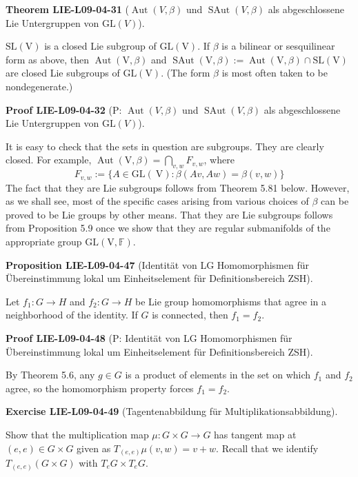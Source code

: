 \documentclass[10pt, letterpaper]{article}
\newcommand{\GL}{\mathrm{GL}}
\newcommand{\CustomHeading}[3]{%
  \par\medskip\noindent%
  \textbf{#1 #2} \textnormal{(#3)}.\enskip%
}
\newenvironment{PROP}[2]{\CustomHeading{Proposition}{#1}{#2}}{}
\newenvironment{THEO}[2]{\CustomHeading{Theorem}{#1}{#2}}{}
\newenvironment{EXE}[2]{\CustomHeading{Exercise}{#1}{#2}}{}
\newenvironment{PROOF}[2]{\CustomHeading{Proof}{#1}{#2}}{}
\begin{document}
\begin{THEO}{LIE-L09-04-31}{$\operatorname{Aut}(V,\beta)$ und $\operatorname{SAut}(V,\beta)$ als abgeschlossene Lie Untergruppen von $\GL(V)$}
$\mathrm{SL}(\mathrm{V})$ is a closed Lie subgroup of $\mathrm{GL}(\mathrm{V})$. If $\beta$ is a bilinear or sesquilinear form as above, then $\operatorname{Aut}(\mathrm{V}, \beta)$ and $\operatorname{SAut}(\mathrm{V}, \beta):= \operatorname{Aut}(\mathrm{V}, \beta) \cap \mathrm{SL}(\mathrm{V})$ are closed Lie subgroups of $\mathrm{GL}(\mathrm{V})$. (The form $\beta$ is most often taken to be nondegenerate.)
\end{THEO}

\begin{PROOF}{LIE-L09-04-32}{P: $\operatorname{Aut}(V,\beta)$ und $\operatorname{SAut}(V,\beta)$ als abgeschlossene Lie Untergruppen von $\GL(V)$}
It is easy to check that the sets in question are subgroups. They are clearly closed. For example, $\operatorname{Aut}(\mathrm{V}, \beta)=\bigcap_{v, w} F_{v, w}$, where
$$
F_{v, w}:=\{A \in \mathrm{GL}(\mathrm{~V}): \beta(A v, A w)=\beta(v, w)\}
$$
The fact that they are Lie subgroups follows from Theorem 5.81 below. However, as we shall see, most of the specific cases arising from various choices of $\beta$ can be proved to be Lie groups by other means. That they are Lie subgroups follows from Proposition 5.9 once we show that they are regular submanifolds of the appropriate group $\mathrm{GL}(\mathrm{V}, \mathbb{F})$.
\end{PROOF}

\begin{PROP}{LIE-L09-04-47}{Identität von LG Homomorphismen für Übereinstimmung lokal um Einheitselement für Definitionsbereich ZSH}
Let $f_{1}: G \rightarrow H$ and $f_{2}: G \rightarrow H$ be Lie group homomorphisms that agree in a neighborhood of the identity. If $G$ is connected, then $f_{1}=f_{2}$.
\end{PROP}

\begin{PROOF}{LIE-L09-04-48}{P: Identität von LG Homomorphismen für Übereinstimmung lokal um Einheitselement für Definitionsbereich ZSH}
By Theorem 5.6, any $g \in G$ is a product of elements in the set on which $f_{1}$ and $f_{2}$ agree, so the homomorphism property forces $f_{1}=f_{2}$.
\end{PROOF}

\begin{EXE}{LIE-L09-04-49}{Tagentenabbildung für Multiplikationsabbildung}
Show that the multiplication map $\mu: G \times G \rightarrow G$ has tangent map at $(e, e) \in G \times G$ given as $T_{(e, e)} \mu(v, w)=v+w$. Recall that we identify $T_{(e, e)}(G \times G)$ with $T_{e} G \times T_{e} G$.
\end{EXE}
\end{document}
